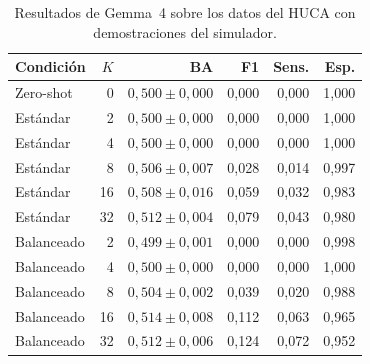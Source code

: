 \begin{table}[H]
  \centering
  \small
  \begin{tabular}{lrrrrr}
    \toprule
    Condición & \(K\) & BA & F1 & Sens. & Esp. \\
    \midrule
    Zero-shot & 0 & \(0,500 \pm 0,000\) & 0,000 & 0,000 & 1,000 \\
    Estándar & 2 & \(0,500 \pm 0,000\) & 0,000 & 0,000 & 1,000 \\
    Estándar & 4 & \(0,500 \pm 0,000\) & 0,000 & 0,000 & 1,000 \\
    Estándar & 8 & \(0,506 \pm 0,007\) & 0,028 & 0,014 & 0,997 \\
    Estándar & 16 & \(0,508 \pm 0,016\) & 0,059 & 0,032 & 0,983 \\
    Estándar & 32 & \(0,512 \pm 0,004\) & 0,079 & 0,043 & 0,980 \\
    Balanceado & 2 & \(0,499 \pm 0,001\) & 0,000 & 0,000 & 0,998 \\
    Balanceado & 4 & \(0,500 \pm 0,000\) & 0,000 & 0,000 & 1,000 \\
    Balanceado & 8 & \(0,504 \pm 0,002\) & 0,039 & 0,020 & 0,988 \\
    Balanceado & 16 & \(0,514 \pm 0,008\) & 0,112 & 0,063 & 0,965 \\
    Balanceado & 32 & \(0,512 \pm 0,006\) & 0,124 & 0,072 & 0,952 \\
    \bottomrule
  \end{tabular}
  \caption{Resultados de Gemma~4 sobre los datos del HUCA con demostraciones del simulador.}
  \label{tab:app_vlm_synthetic_context}
  \resultstablenote
\end{table}
